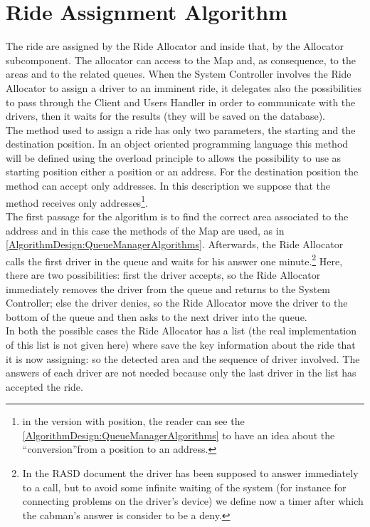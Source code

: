 \documentclass[\mainpath/main]{subfiles}
\begin{document}
\section{Ride Assignment Algorithm}
\label{AlgorithmDesign:RideAssignmentAlgorithm}

The ride are assigned by the Ride Allocator and inside that, by the Allocator subcomponent. The allocator can access to the Map and, as consequence, to the areas and to the related queues. When the System Controller involves the Ride Allocator to assign a driver to an imminent ride, it delegates also the possibilities to pass through the Client and Users Handler in order to communicate with the drivers, then it waits for the results (they will be saved on the database).\\
The method used to assign a ride has only two parameters, the starting and the destination position. In an object oriented programming language this method will be defined using the overload principle to allows the possibility to use as starting position either a position or an address. For the destination position the method can accept only addresses. In this description we suppose that the method receives only addresses\footnote{in the version with position, the reader can see the \autoref{AlgorithmDesign:QueueManagerAlgorithms} to have an idea about the \textquotedblleft conversion\textquotedblright from a position to an address.}.\\
The first passage for the algorithm is to find the correct area associated to the address and in this case the methods of the Map are used, as in \autoref{AlgorithmDesign:QueueManagerAlgorithms}. Afterwards, the Ride Allocator calls the first driver in the queue and waits for his answer one minute.\footnote{In the RASD document the driver has been supposed to answer immediately to a call, but to avoid some infinite waiting of the system (for instance for connecting problems on the driver's device) we define now a timer after which the cabman's answer is consider to be a deny.} Here, there are two possibilities: first the driver accepts, so the Ride Allocator immediately removes the driver from the queue and returns to the System Controller; else the driver denies, so the Ride Allocator move the driver to the bottom of the queue and then asks to the next driver into the queue.\\
In both the possible cases the Ride Allocator has a list (the real implementation of this list is not given here) where save the key information about the ride that it is now assigning: so the detected area and the sequence of driver involved. The answers of each driver are not needed because only the last driver in the list has accepted the ride.\\
\end{document}
